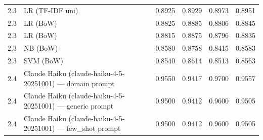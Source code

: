 \begin{table}
\begin{tabular}{llrrrr}
2.3 & LR (TF-IDF uni) & 0.8925 & 0.8929 & 0.8973 & 0.8951 \\
2.3 & LR (BoW) & 0.8825 & 0.8885 & 0.8806 & 0.8845 \\
2.3 & LR (BoW) & 0.8815 & 0.8875 & 0.8796 & 0.8835 \\
2.3 & NB (BoW) & 0.8580 & 0.8758 & 0.8415 & 0.8583 \\
2.3 & SVM (BoW) & 0.8540 & 0.8614 & 0.8513 & 0.8563 \\
2.4 & Claude Haiku (claude-haiku-4-5-20251001) — domain prompt & 0.9550 & 0.9417 & 0.9700 & 0.9557 \\
2.4 & Claude Haiku (claude-haiku-4-5-20251001) — generic prompt & 0.9500 & 0.9412 & 0.9600 & 0.9505 \\
2.4 & Claude Haiku (claude-haiku-4-5-20251001) — few_shot prompt & 0.9500 & 0.9412 & 0.9600 & 0.9505 \\
\bottomrule
\end{tabular}
\end{table}
